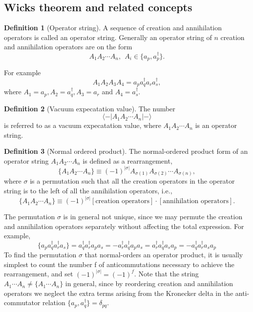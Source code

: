 \documentclass[a4paper,10pt]{report}
\newcommand{\braket}[1]{\langle#1\rangle}
\theoremstyle{definition}
\newtheorem{definition}{Definition}
\begin{document}
\subsection*{Wicks theorem and related concepts}
\begin{definition}[Operator string]
 A sequence of creation and annihilation operators is called an operator string. Generally an operator 
string of $n$ creation and annihilation operators are on the form 
\begin{equation}
 A_1 A_2 \cdots A_n, \ \ A_i \in \{a_p,a_p^\dagger\}.
\end{equation}

For example
$$A_1A_2A_3A_4 = a_p a_q^\dagger a_r a_s^\dagger,$$
where $A_1 = a_p, A_2 = a_q^\dagger, A_3 = a_r$ and $A_4 = a_s^\dagger$.
\end{definition}
\begin{definition}[Vacuum expecatation value]
The number 
\begin{equation}
 \braket{-|A_1 A_2 \cdots A_n|-}
\end{equation}
is referred to as a vacuum expecatation value, where $A_1A_2 \cdots A_n$ is an operator string. 
\end{definition}
\begin{definition}[Normal ordered product]
The normal-ordered product form of an operator 
string $A_1A_2\cdots A_n$ is defined as a rearrangement,
\begin{equation}
 \{A_1A_2\cdots A_n \} \equiv (-1)^{|\sigma|}A_{\sigma(1)}A_{\sigma(2)}\cdots A_{\sigma(n)},
\end{equation}
where $\sigma$ is a permutation such that all the creation operators in the operator string is to the left of all the
annihilation operators, i.e.,
\begin{equation}
 \{A_1A_2\cdots A_n \} \equiv (-1)^{|\sigma|}[\text{creation operators}]\cdot[\text{annihilation operators}].
\end{equation}
\end{definition}
The permutation $\sigma$ is in general not unique, since we may permute the creation and annihilation
operators separately without affecting the total expression. For example,
\begin{equation}
 \{a_p a_q^\dagger a_r^\dagger a_s \} = a_q^\dagger a_r^\dagger a_p a_s = -a_r^\dagger a_q^\dagger a_p a_s = a_r^\dagger a_q^\dagger a_s a_p = -a_q^\dagger a_r^\dagger a_s a_p
\end{equation}
To find the permutation $\sigma$ that normal-orders an operator product, it is usually simplest to count the
number f of anticommutations necessary to achieve the rearrangement, and set $(-1)^{|\sigma |} = (-1)^f$.
Note that the string $A_1\cdots A_n \neq \{ A_1 \cdots A_n \}$ in general, since by reordering creation and annihilation
operators we neglect the extra terms arising from the Kronecker delta in the anti-commutator relation
$\{ a_p , a_q^\dagger \} = \delta_{pq}$.
\end{document}

